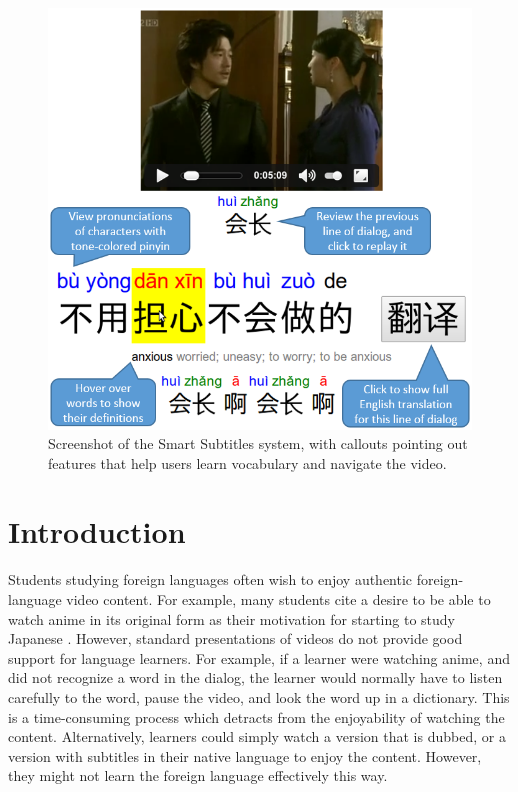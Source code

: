 \documentclass{sigchi}
\begin{document}
\begin{figure}[!h]
\centering
\includegraphics[width=\columnwidth]{smartsubs-features}
\caption{Screenshot of the Smart Subtitles system,
with callouts pointing out features that help users
learn vocabulary and navigate the video.}
\label{fig:figure1}
\end{figure}

\section{Introduction}

Students studying foreign languages often wish to enjoy authentic foreign-language video content. For example, many students cite a desire to be able to watch anime in its original form as their motivation for starting to study Japanese \cite{anime}. However, standard presentations of videos do not
provide good support for language learners. For example, if a learner were watching anime, and did not recognize a word in the dialog, the learner would normally have
to listen carefully to the word, pause the video, and look the word up in a dictionary. This is a time-consuming process which detracts from the enjoyability of watching the content. Alternatively, learners could simply watch a version that is dubbed, or a version with subtitles in their native language to enjoy the content. However, they might not learn the foreign language effectively this way.
\end{document}
